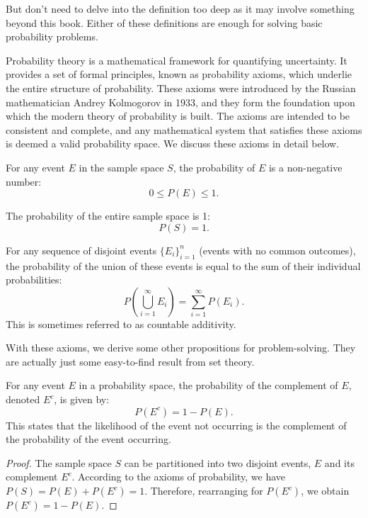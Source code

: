     But don't need to delve into the definition too deep as it may involve something
    beyond this book. Either of these definitions are enough for solving basic
    probability problems.

    Probability theory is a mathematical framework for quantifying uncertainty. It provides a set of formal principles, known as probability axioms, which underlie the entire structure of probability. These axioms were introduced by the Russian mathematician Andrey Kolmogorov in 1933, and they form the foundation upon which the modern theory of probability is built. The axioms are intended to be consistent and complete, and any mathematical system that satisfies these axioms is deemed a valid probability space. We discuss these axioms in detail below.

    \begin{axiom}
    For any event \( E \) in the sample space \( S \), the probability of \( E \) is a non-negative number:
    \[0\leq P(E) \leq 1. \]
    \end{axiom}

    \begin{axiom}
    The probability of the entire sample space is 1:
    \[ P(S) = 1. \]
    \end{axiom}

    \begin{axiom}[Additivity]\label{additivity}
    For any sequence of disjoint events \( \{E_i\}_{i=1}^n\) (events with no common outcomes), the probability of the union of these events is equal to the sum of their individual probabilities:
    \[ P\left(\bigcup_{i=1}^{\infty} E_i\right) = \sum_{i=1}^{\infty} P(E_i). \]
    This is sometimes referred to as countable additivity.
    \end{axiom}

    With these axioms, we derive some other propositions for problem-solving. 
    They are actually just some easy-to-find result from set theory.

    \begin{proposition}
    For any event \( E \) in a probability space, the probability of the complement of \( E \), denoted \( E^c \), is given by:
    \[ P(E^c) = 1 - P(E). \]
    This states that the likelihood of the event not occurring is the complement of the probability of the event occurring.
    \end{proposition}
    
    \begin{proof}
    The sample space \( S \) can be partitioned into two disjoint events, \( E \) and its complement \( E^c \). According to the axioms of probability, we have \( P(S) = P(E) + P(E^c) = 1 \). Therefore, rearranging for \( P(E^c) \), we obtain \( P(E^c) = 1 - P(E) \).
    \end{proof}
    
